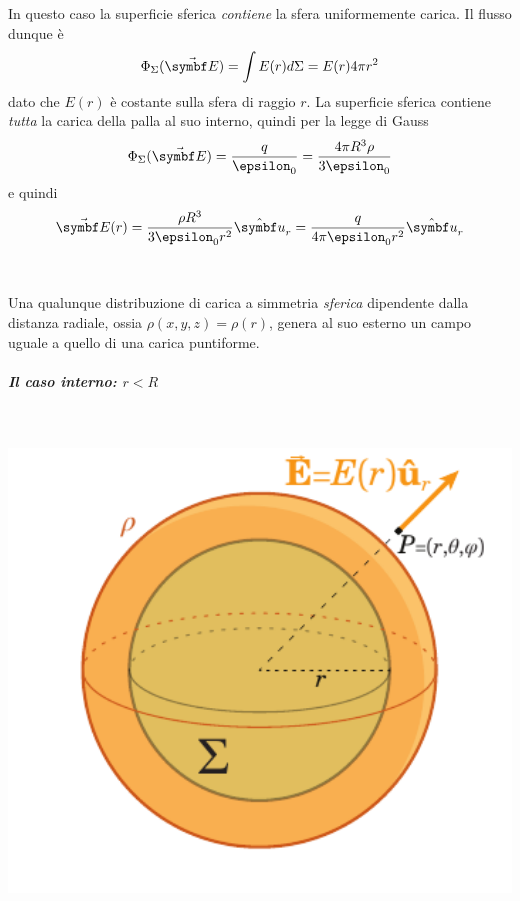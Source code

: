 \begin{minipage}{0.54\textwidth}
	In questo caso la superficie sferica \textit{contiene} la sfera uniformemente carica. Il flusso dunque è
	\begin{equation*}
		\Phi_{\Sigma}(\vba{E})=\int E(r)d\Sigma=E(r)4\pi r^2
	\end{equation*}
	dato che $E(r)$ è costante sulla sfera di raggio $r$.
	La superficie sferica contiene \textit{tutta} la carica della palla al suo interno, quindi per la legge di Gauss
	\begin{equation*}
		\Phi_{\Sigma}(\vba{E})=\frac{q}{\epsilon_0}=\frac{4 \pi R^3\rho}{3\epsilon_0}
	\end{equation*}
	e quindi
	\begin{equation}
		\vba{E}(r)=\frac{\rho R^3}{3\epsilon_0r^2}\vbh{u}_r=\frac{q}{4\pi\epsilon_0 r^2}\vbh{u}_r
	\end{equation}
\end{minipage}\\
\begin{observe}
	Una qualunque distribuzione di carica a simmetria \textit{sferica} dipendente dalla distanza radiale, ossia $\rho(x,y,z)=\rho(r)$, genera al suo esterno un campo uguale a quello di una carica puntiforme.
\end{observe}
\subparagraph{Il caso interno: $r<R$}~\\
\begin{minipage}{0.45\textwidth}
	\begin{center}
		\includegraphics[width=1\textwidth]{images/chp2/chp2sferacarica2.pdf}
	\end{center}
\end{minipage}\hspace{5pt}
